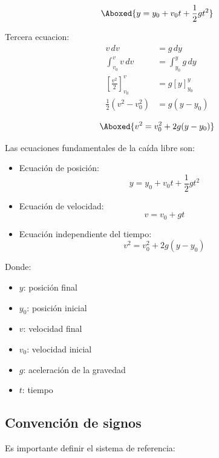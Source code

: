 \vspace{-20pt}

\begin{align*}
    \Aboxed{y = y_0 + v_0 t + \frac{1}{2}gt^2}
\end{align*}

Tercera ecuacion:
\begin{align*}
v\,dv &= g\,dy \\
\int_{v_0}^{v} v\,dv &= \int_{y_0}^{y} g\,dy \\
\left[\frac{v^2}{2}\right]_{v_0}^{v} &= g\left[y\right]_{y_0}^{y} \\
\frac{1}{2}(v^2 - v_0^2) &= g(y - y_0)
\end{align*}

\vspace{-30pt}

\begin{align*}
    \Aboxed{v^2 = v_0^2 + 2g(y - y_0)}
\end{align*}

Las ecuaciones fundamentales de la caída libre son:

\begin{itemize}
    \item Ecuación de posición:
    \[
    y = y_0 + v_0 t + \frac{1}{2}gt^2
    \]

    \item Ecuación de velocidad:
    \[
    v = v_0 + gt
    \]

    \item Ecuación independiente del tiempo:
    \[
    v^2 = v_0^2 + 2g(y - y_0)
    \]
\end{itemize}

Donde:
\begin{itemize}
    \setlength{\itemsep}{0pt}
    \item $y$: posición final
    \item $y_0$: posición inicial
    \item $v$: velocidad final
    \item $v_0$: velocidad inicial
    \item $g$: aceleración de la gravedad
    \item $t$: tiempo
\end{itemize}

\subsection{Convención de signos}

Es importante definir el sistema de referencia:

